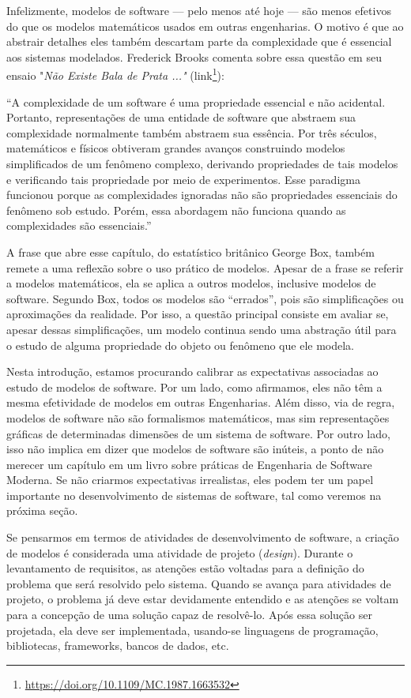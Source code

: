 \documentclass[
  11pt,
  twoside]{book}
\DeclareRobustCommand{\href}[2]{#2\footnote{\url{#1}}}
\renewenvironment{quote}{\centering \vspace{1.5ex} \begin{tcolorbox}[colback=backcolor, width=4.9in]}{\end{tcolorbox}}
\begin{document}
Infelizmente, modelos de software --- pelo menos até hoje --- são menos
efetivos do que os modelos matemáticos usados em outras engenharias. O
motivo é que ao abstrair detalhes eles também descartam parte da
complexidade que é essencial aos sistemas modelados. Frederick Brooks
comenta sobre essa questão em seu ensaio "\emph{Não Existe Bala de Prata
..."} (\href{https://doi.org/10.1109/MC.1987.1663532}{link}):

\begin{quote}
``A complexidade de um software é uma propriedade essencial e não
acidental. Portanto, representações de uma entidade de software que
abstraem sua complexidade normalmente também abstraem sua essência. Por
três séculos, matemáticos e físicos obtiveram grandes avanços
construindo modelos simplificados de um fenômeno complexo, derivando
propriedades de tais modelos e verificando tais propriedade por meio de
experimentos. Esse paradigma funcionou porque as complexidades ignoradas
não são propriedades essenciais do fenômeno sob estudo. Porém, essa
abordagem não funciona quando as complexidades são essenciais.''
\end{quote}

 A frase que abre esse capítulo, do estatístico
britânico George Box, também remete a uma reflexão sobre o uso prático
de modelos. Apesar de a frase se referir a modelos matemáticos, ela se
aplica a outros modelos, inclusive modelos de software. Segundo Box,
todos os modelos são ``errados'', pois são simplificações ou
aproximações da realidade. Por isso, a questão principal consiste em
avaliar se, apesar dessas simplificações, um modelo continua sendo uma
abstração útil para o estudo de alguma propriedade do objeto ou fenômeno
que ele modela.

Nesta introdução, estamos procurando calibrar as expectativas associadas
ao estudo de modelos de software. Por um lado, como afirmamos, eles não
têm a mesma efetividade de modelos em outras Engenharias. Além disso,
via de regra, modelos de software não são formalismos matemáticos, mas
sim representações gráficas de determinadas dimensões de um sistema de
software. Por outro lado, isso não implica em dizer que modelos de
software são inúteis, a ponto de não merecer um capítulo em um livro
sobre práticas de Engenharia de Software Moderna. Se não criarmos
expectativas irrealistas, eles podem ter um papel importante no
desenvolvimento de sistemas de software, tal como veremos na próxima
seção.

Se pensarmos em termos de atividades de desenvolvimento de software, a
criação de modelos é considerada uma atividade de projeto
(\emph{design}). Durante o levantamento de requisitos, as atenções estão
voltadas para a definição do problema que será resolvido pelo sistema.
Quando se avança para atividades de projeto, o problema já deve estar
devidamente entendido e as atenções se voltam para a concepção de uma
solução capaz de resolvê-lo. Após essa solução ser projetada, ela deve
ser implementada, usando-se linguagens de programação, bibliotecas,
frameworks, bancos de dados, etc.
\end{document}
